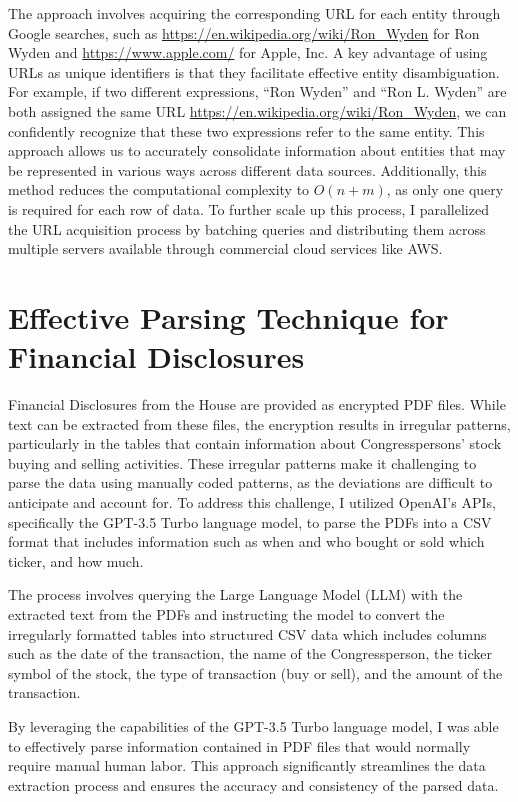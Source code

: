 \documentclass[15pt,letterpaper]{article}
\begin{document}
The approach involves acquiring the corresponding URL for each entity through Google searches, such as \url{https://en.wikipedia.org/wiki/Ron_Wyden} for Ron Wyden and \url{https://www.apple.com/} for Apple, Inc. A key advantage of using URLs as unique identifiers is that they facilitate effective entity disambiguation. For example, if two different expressions, ``Ron Wyden'' and ``Ron L. Wyden'' are both assigned the same URL \url{https://en.wikipedia.org/wiki/Ron_Wyden}, we can confidently recognize that these two expressions refer to the same entity. This approach allows us to accurately consolidate information about entities that may be represented in various ways across different data sources. Additionally, this method reduces the computational complexity to 
$O(n+m)$, as only one query is required for each row of data. To further scale up this process, I parallelized the URL acquisition process by batching queries and distributing them across multiple servers available through commercial cloud services like AWS.

\section{Effective Parsing Technique for Financial Disclosures}\label{app:par}

Financial Disclosures from the House are provided as encrypted PDF files. While text can be extracted from these files, the encryption results in irregular patterns, particularly in the tables that contain information about Congresspersons' stock buying and selling activities. These irregular patterns make it challenging to parse the data using manually coded patterns, as the deviations are difficult to anticipate and account for. To address this challenge, I utilized OpenAI's APIs, specifically the GPT-3.5 Turbo language model, to parse the PDFs into a CSV format that includes information such as when and who bought or sold which ticker, and how much.

The process involves querying the Large Language Model (LLM) with the extracted text from the PDFs and instructing the model to convert the irregularly formatted tables into structured CSV data which includes columns such as the date of the transaction, the name of the Congressperson, the ticker symbol of the stock, the type of transaction (buy or sell), and the amount of the transaction.

By leveraging the capabilities of the GPT-3.5 Turbo language model, I was able to effectively parse information contained in PDF files that would normally require manual human labor. This approach significantly streamlines the data extraction process and ensures the accuracy and consistency of the parsed data.
\end{document}
